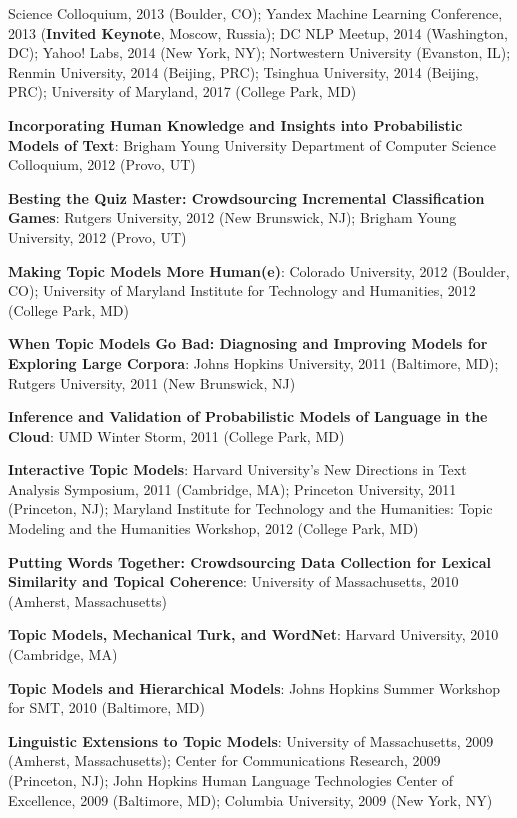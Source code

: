 {{\begin{enumerate*}
          Science Colloquium, 2013 (Boulder, CO); Yandex Machine
          Learning Conference, 2013 ({\bf Invited Keynote}, Moscow,
          Russia); DC NLP Meetup, 2014 (Washington, DC); Yahoo! Labs, 2014 (New
          York, NY); Nortwestern University (Evanston, IL); Renmin
          University, 2014 (Beijing, PRC); Tsinghua University, 2014
          (Beijing, PRC); University of Maryland, 2017 (College Park, MD)
	\item {\bf Incorporating Human Knowledge and Insights into Probabilistic Models of Text}: Brigham Young University Department of Computer Science Colloquium, 2012 (Provo, UT)
	\item {\bf Besting the Quiz Master: Crowdsourcing Incremental Classification Games}: Rutgers University, 2012 (New Brunswick, NJ); Brigham Young University, 2012 (Provo, UT)
	\item {\bf Making Topic Models More Human(e)}: Colorado University, 2012 (Boulder, CO); University of Maryland Institute for Technology and Humanities, 2012 (College Park, MD)
	\item {\bf When Topic Models Go Bad: Diagnosing and Improving Models for Exploring Large Corpora}: Johns Hopkins University, 2011 (Baltimore, MD); Rutgers University, 2011 (New Brunswick, NJ)
	\item {\bf Inference and Validation of Probabilistic Models of Language in the Cloud}: UMD Winter Storm, 2011 (College Park, MD)
	\item {\bf Interactive Topic Models}: Harvard University's New Directions in Text Analysis Symposium, 2011 (Cambridge, MA); Princeton University, 2011 (Princeton, NJ); Maryland Institute for Technology and the Humanities: Topic Modeling and the Humanities Workshop, 2012 (College Park, MD)
	\item {\bf Putting Words Together: Crowdsourcing Data Collection for Lexical Similarity and Topical Coherence}: University of Massachusetts, 2010 (Amherst, Massachusetts)
	\item {\bf Topic Models, Mechanical Turk, and WordNet}: Harvard University, 2010 (Cambridge, MA)
	\item {\bf Topic Models and Hierarchical Models}: Johns Hopkins Summer Workshop for SMT, 2010 (Baltimore, MD)
	\item {\bf Linguistic Extensions to Topic Models}: University of
          Massachusetts, 2009 (Amherst, Massachusetts); Center for
          Communications Research, 2009 (Princeton, NJ); John Hopkins Human
          Language Technologies Center of Excellence, 2009 (Baltimore, MD); Columbia University, 2009 (New York, NY)
\end{enumerate*}


}
}



